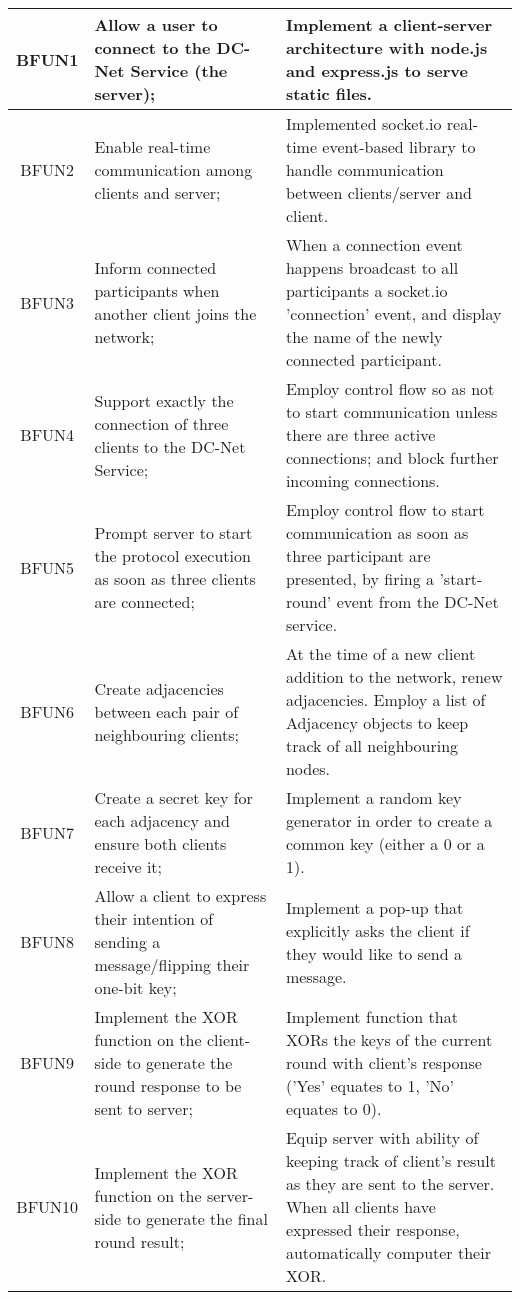 \begin{longtable}[c]{| c | p{4cm} | p{6cm} |}
\endlastfoot
BFUN1 & Allow a user to connect to the DC-Net Service (the server); & Implement a client-server architecture with node.js and express.js to serve static files.\\ 
\hline
BFUN2 & Enable real-time communication among clients and server; & Implemented socket.io real-time event-based library to handle communication between clients/server and client.\\
\hline
BFUN3 & Inform connected participants when another client joins the network; & When a connection event happens broadcast to all participants a socket.io 'connection' event, and display the name of the newly connected participant.\\
\hline
BFUN4 & Support exactly the connection of three clients to the DC-Net Service; & Employ control flow so as not to start communication unless there are three active connections; and block further incoming connections.\\
\hline
BFUN5 & Prompt server to start the protocol execution as soon as three clients are connected; & Employ control flow to start communication as soon as three participant are presented, by firing a 'start-round' event from the DC-Net service.\\
\hline
BFUN6 & Create adjacencies between each pair of neighbouring clients; & At the time of a new client addition to the network, renew adjacencies. Employ a list of Adjacency objects to keep track of all neighbouring nodes.\\
\hline
BFUN7 & Create a secret key for each adjacency and ensure both clients receive it; & Implement a random key generator in order to create a common key (either a 0 or a 1).\\
\hline
BFUN8 & Allow a client to express their intention of sending a message/flipping their one-bit key; & Implement a pop-up that explicitly asks the client if they would like to send a message.\\
\hline
BFUN9 & Implement the XOR function on the client-side to generate the round response to be sent to server; & Implement function that XORs the keys of the current round with client's response ('Yes' equates to 1, 'No' equates to 0).\\
\hline
BFUN10 & Implement the XOR function on the server-side to generate the final round result; & Equip server with ability of keeping track of client's result as they are sent to the server. When all clients have expressed their response, automatically computer their XOR.\\

\end{longtable}
